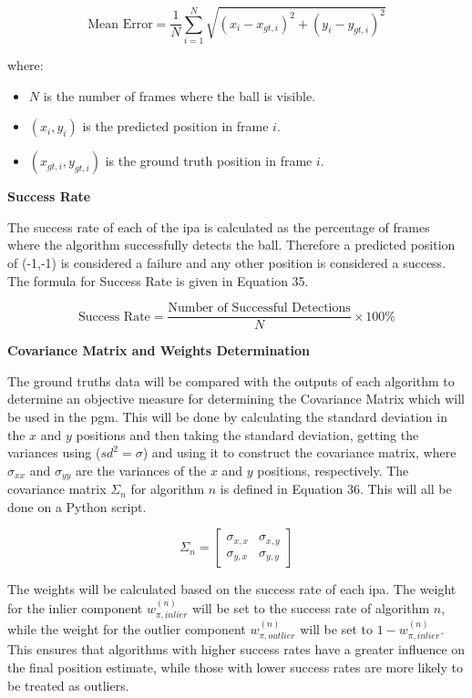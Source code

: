 \documentclass[12pt,a4paper]{article}
\begin{document}
\begin{equation}
\text{Mean Error} = \frac{1}{N} \sum_{i=1}^{N} \sqrt{(x_i - x_{gt,i})^2 + (y_i - y_{gt,i})^2}
\end{equation}

where:
\begin{itemize}
	\item $N$ is the number of frames where the ball is visible.
	\item $(x_i, y_i)$ is the predicted position in frame $i$.
	\item $(x_{gt,i}, y_{gt,i})$ is the ground truth position in frame $i$.
\end{itemize}

\textbf{Success Rate}

The success rate of each of the \acs{ipa} is calculated as the percentage of frames where the algorithm successfully detects the ball. Therefore a predicted position of (-1,-1) is considered a failure and any other position is considered a success. The formula for Success Rate is given in Equation 35.

\begin{equation}
\text{Success Rate} = \frac{\text{Number of Successful Detections}}{N} \times 100\%
\end{equation}

\textbf{Covariance Matrix and Weights Determination}

The ground truths data will be compared with the outputs of each algorithm to determine an objective measure for determining the Covariance Matrix which will be used in the \acs{pgm}. This will be done by calculating the standard deviation in the $x$ and $y$ positions and then taking the standard deviation, getting the variances using ($sd^2 = \sigma$) and using it to construct the covariance matrix, where $\sigma_{xx}$ and $\sigma_{yy}$ are the variances of the $x$ and $y$ positions, respectively. The covariance matrix $\Sigma_n$ for algorithm $n$ is defined in Equation 36. This will all be done on a Python script.

\begin{equation}
\Sigma_n = \begin{bmatrix}
\sigma_{x,x} & \sigma_{x,y} \\
\sigma_{y,x} & \sigma_{y,y}
\end{bmatrix}
\end{equation}

The weights will be calculated based on the success rate of each \acs{ipa}. The weight for the inlier component $w_{\pi,inlier}^{(n)}$ will be set to the success rate of algorithm $n$, while the weight for the outlier component $w_{\pi,outlier}^{(n)}$ will be set to $1 - w_{\pi,inlier}^{(n)}$. This ensures that algorithms with higher success rates have a greater influence on the final position estimate, while those with lower success rates are more likely to be treated as outliers.
\end{document}
